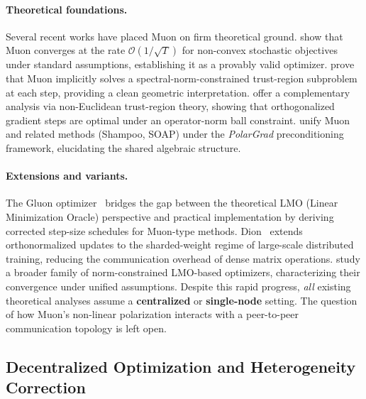 \paragraph{Theoretical foundations.}
Several recent works have placed Muon on firm theoretical ground.
\citet{li2025note} show that Muon converges at the rate
$\mathcal{O}(1/\sqrt{T})$ for non-convex stochastic objectives under standard
assumptions, establishing it as a provably valid optimizer.
\citet{chen2025muon_spectral} prove that Muon implicitly solves a
spectral-norm-constrained trust-region subproblem at each step, providing a
clean geometric interpretation.
\citet{kovalev2025gradient} offer a complementary analysis via non-Euclidean
trust-region theory, showing that orthogonalized gradient steps are optimal
under an operator-norm ball constraint.
\citet{polargrad2025} unify Muon and related methods (Shampoo, SOAP) under the
\emph{PolarGrad} preconditioning framework, elucidating the shared algebraic
structure.

\paragraph{Extensions and variants.}
The Gluon optimizer~\citep{riabinin2025gluon} bridges the gap between the
theoretical LMO (Linear Minimization Oracle) perspective and practical
implementation by deriving corrected step-size schedules for Muon-type methods.
Dion~\citep{ahn2025dion} extends orthonormalized updates to the sharded-weight
regime of large-scale distributed training, reducing the communication overhead
of dense matrix operations.
\citet{pethick2025norm} study a broader family of norm-constrained LMO-based
optimizers, characterizing their convergence under unified assumptions.
Despite this rapid progress, \emph{all} existing theoretical analyses assume a
\textbf{centralized} or \textbf{single-node} setting.  The question of how
Muon's non-linear polarization interacts with a peer-to-peer communication
topology is left open.

\subsection{Decentralized Optimization and Heterogeneity Correction}
\label{subsec:decentralized}


